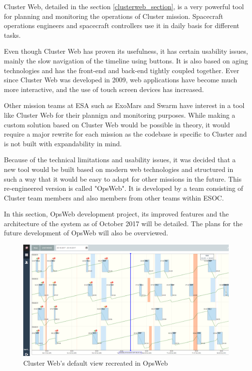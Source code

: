 Cluster Web, detailed in the section \ref{clusterweb_section}, is a very powerful tool for planning and monitoring the operations of Cluster mission. Spacecraft operations engineers and spacecraft controllers use it in daily basis for different tasks.

Even though Cluster Web has proven its usefulness, it has certain usability issues, mainly the slow navigation of the timeline using buttons. It is also based on aging technologies and has the front-end and back-end tightly coupled together. Ever since Cluster Web was developed in 2009, web applications have become much more interactive, and the use of touch screen devices has increased.

Other mission teams at ESA such as ExoMars and Swarm have interest in a tool like Cluster Web for their plannign and monitoring purposes. While making a custom solution based on Cluster Web would be possible in theory, it would require a major rewrite for each mission as the codebase is specific to Cluster and is not built with expandability in mind.

Because of the technical limitations and usability issues, it was decided that a new tool would be built based on modern web technologies and structured in such a way that it would be easy to adapt for other missions in the future. This re-engineered version is called "OpsWeb". It is developed by a team consisting of Cluster team members and also members from other teams within ESOC.

In this section, OpsWeb development project, its improved features and the architecture of the system as of October 2017 will be detailed. The plans for the future development of OpsWeb will also be overviewed.

\begin{figure}[ht]
  \begin{center}
    \includegraphics*[width=1\textwidth]{new_cw}
  \end{center}
  \caption{Cluster Web's default view recreated in OpsWeb}
  \label{fig:new_cw}
\end{figure}

